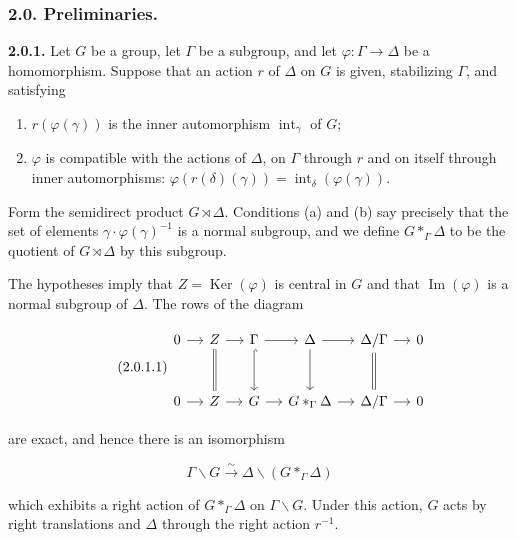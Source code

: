 \documentclass[10pt,a4paper]{article}
\begin{document}
\subsubsection{2.0. Preliminaries.}

\textbf{2.0.1.} Let \(G\) be a group, let \(\Gamma\) be a subgroup, and let \(\varphi:\Gamma\to\Delta\) be a homomorphism. Suppose that an action \(r\) of \(\Delta\) on \(G\) is given, stabilizing \(\Gamma\), and satisfying

\begin{enumerate}
\def\labelenumi{(\alph{enumi})}
\item
  \(r(\varphi(\gamma))\) is the inner automorphism \(\operatorname{int}_\gamma\) of \(G\);
\item
  \(\varphi\) is compatible with the actions of \(\Delta\), on \(\Gamma\) through \(r\) and on itself through inner automorphisms: \(\varphi(r(\delta)(\gamma))=\operatorname{int}_\delta(\varphi(\gamma))\).
\end{enumerate}

Form the semidirect product \(G\rtimes\Delta\). Conditions (a) and (b) say precisely that the set of elements \(\gamma\cdot\varphi(\gamma)^{-1}\) is a normal subgroup, and we define \(G*_{\Gamma}\Delta\) to be the quotient of \(G\rtimes\Delta\) by this subgroup.

The hypotheses imply that \(Z=\operatorname{Ker}(\varphi)\) is central in \(G\) and that \(\operatorname{Im}(\varphi)\) is a normal subgroup of \(\Delta\). The rows of the diagram

\begin{equation}
\tag{2.0.1.1}
\begin{tikzcd}[column sep=small,row sep=large]
0 \arrow[r] & Z \arrow[r] \arrow[d,equal] & \Gamma \arrow[r] \arrow[d,hook] & \Delta \arrow[r] \arrow[d] & \Delta/\Gamma \arrow[r] \arrow[d,equal] & 0 \\
0 \arrow[r] & Z \arrow[r] & G \arrow[r] & G*_{\Gamma}\Delta \arrow[r] & \Delta/\Gamma \arrow[r] & 0
\end{tikzcd}
\end{equation}

are exact, and hence there is an isomorphism

\[
\Gamma\backslash G\xrightarrow{\sim}\Delta\backslash(G*_{\Gamma}\Delta) \tag{2.0.1.2}
\]

which exhibits a right action of \(G*_{\Gamma}\Delta\) on \(\Gamma\backslash G\). Under this action, \(G\) acts by right translations and \(\Delta\) through the right action \(r^{-1}\).
\end{document}
